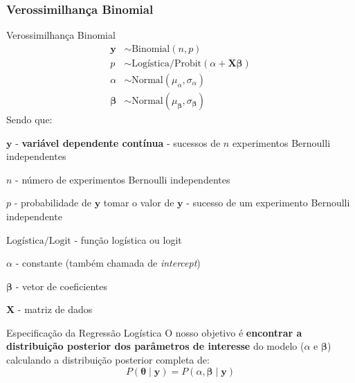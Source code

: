 \subsubsection{Verossimilhança Binomial}
\begin{frame}{Verossimilhança Binomial}
	\small
	$$
		\begin{aligned}
			\boldsymbol{y}     & \sim \text{Binomial}\left(n,  p\right)                                    \\
			p                  & \sim \text{Logística/Probit}(\alpha +  \mathbf{X} \boldsymbol{\beta})     \\
			\alpha             & \sim \text{Normal}(\mu_\alpha, \sigma_\alpha)                             \\
			\boldsymbol{\beta} & \sim \text{Normal}(\mu_{\boldsymbol{\beta}}, \sigma_{\boldsymbol{\beta}})
		\end{aligned}
	$$
	Sendo que:
	\begin{vfilleditems}
		\item \small $\boldsymbol{y}$ - \textbf{variável dependente contínua} - sucessos de $n$ experimentos Bernoulli independentes
		\item \small $n$ - número de experimentos Bernoulli independentes
		\item \small $p$ - probabilidade de $\boldsymbol{y}$ tomar o valor de $\boldsymbol{y}$ - sucesso de um experimento Bernoulli independente
		\item \small $\text{Logística/Logit}$ - função logística ou logit
		\item \small $\alpha$ - constante (também chamada de \textit{intercept})
		\item \small $\boldsymbol{\beta}$ - vetor de coeficientes
		\item \small $\mathbf{X}$ - matriz de dados
	\end{vfilleditems}
\end{frame}

\begin{frame}{Especificação da Regressão Logística}
	O nosso objetivo é \textbf{encontrar a distribuição posterior dos parâmetros de
		interesse} do modelo ($\alpha$ e $\boldsymbol{\beta}$) calculando a distribuição
	posterior completa de:
	$$
		P(\boldsymbol{\theta} \mid \boldsymbol{y}) = P(\alpha, \boldsymbol{\beta} \mid \boldsymbol{y})
	$$
\end{frame}

